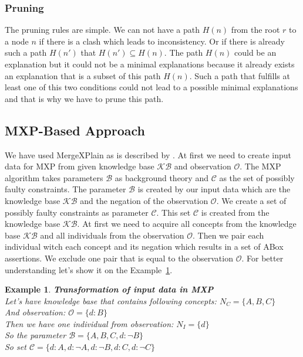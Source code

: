 \documentclass[12pt,a4paper]{article}
\newtheorem{example}{Example}[subsection]
\begin{document}
\subsubsection{Pruning}
\label{subsubsection:pruning}
The pruning rules are simple. We can not have a path $H(n)$ from the root $r$ to a node $n$ if there is a clash which leads to inconsistency. Or if there is already such a path $H(n')$ that $H(n') \subseteq H(n)$. The path $H(n)$ could be an explanation but it could not be a minimal explanations because it already exists an explanation that is a subset of this path $H(n)$. Such a path that fulfills at least one of this two conditions could not lead to a possible minimal explanations and that is why we have to prune this path.

\subsection{MXP-Based Approach}
\label{subsection:MXPBasedApproach}
We have used MergeXPlain as is described by \cite{MXP}. At first we need to create input data for MXP from given knowledge base $\mathcal{KB}$ and observation $\mathcal{O}$. The MXP algorithm takes parameters $\mathcal{B}$ as background theory and $\mathcal{C}$ as the set of possibly faulty constraints. The parameter $\mathcal{B}$ is created by our input data which are the knowledge base $\mathcal{KB}$ and the negation of the observation $\mathcal{O}$. We create a set of possibly faulty constraints as parameter $\mathcal{C}$. This set $\mathcal{C}$ is created from the knowledge base $\mathcal{KB}$. At first we need to acquire all concepts from the knowledge base $\mathcal{KB}$ and all individuals from the observation $\mathcal{O}$. Then we pair each individual witch each concept and its negation which results in a set of ABox assertions. We exclude one pair that is equal to the observation $\mathcal{O}$. For better understanding let's show it on the Example~\ref{example:mxpTransform}.

\begin{example}{\textbf{Transformation of input data in MXP}} \\
	\label{example:mxpTransform}
	\noindent Let's have knowledge base that contains following concepts: 
	$N_{C} = \{ A, B, C \}$ \\
	And observation: $\mathcal{O} = \{ d:B \}$ \\
	Then we have one individual from observation: $N_{I} = \{ d \} $ \\
	So the parameter $\mathcal{B} = \{ A,B,C, d: \neg B  \} $ \\
	So set $\mathcal{C} = \{ d:A, d:\neg A, d:\neg B, d:C, d:\neg C \}$
\end{example}
\end{document}
